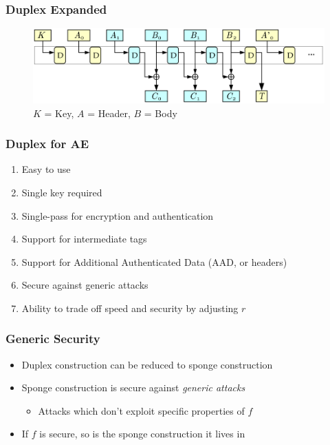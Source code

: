 \begin{frame}
\frametitle{Duplex Expanded}
\begin{figure}[ht]
\centering
\includegraphics[width=\textwidth]{img/DuplexAE_Expanded.png}
\caption{$K$ = Key, $A$ = Header, $B$ = Body \cite{Bertoni2010_DuplexingSlides}}
\label{fig:DuplexAE_Expanded}
\end{figure}
\end{frame}

\begin{frame}
\frametitle{Duplex for AE}
\begin{enumerate}
  \item Easy to use
  \item Single key required
  \item Single-pass for encryption and authentication
  \item Support for intermediate tags
  \item Support for Additional Authenticated Data (AAD, or headers)
  \item Secure against generic attacks
  \item Ability to trade off speed and security by adjusting $r$
\end{enumerate}
\end{frame}

\begin{frame}
\frametitle{Generic Security}
\begin{itemize}
  \item Duplex construction can be reduced to sponge construction
  \item Sponge construction is secure against \emph{generic attacks}
  \begin{itemize}
    \item Attacks which don't exploit specific properties of $f$
  \end{itemize}
  \item If $f$ is secure, so is the sponge construction it lives in
\end{itemize}
\end{frame}

